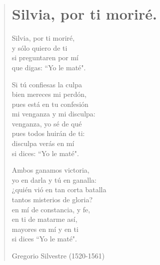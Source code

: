 \documentclass[12pt, twoside]{book}
\begin{document}
\newpage
\begin{verse}
\begin{center}
\section{Silvia, por ti moriré.}
\end{center}
Silvia, por ti moriré,\\
y sólo quiero de ti\\
si preguntaren por mí\\
que digas: ``Yo le maté".\newline

Si tú confiesas la culpa\\
bien mereces mi perdón,\\
pues está en tu confesión\\
mi venganza y mi disculpa:\\
venganza, yo sé de qué\\
pues todos huirán de ti:\\
disculpa verás en mí\\
si dices: ``Yo le maté".\newline

Ambos ganamos victoria,\\
yo en darla y tú en ganalla:\\
¿quién vió en tan corta batalla\\
tantos misterios de gloria?\\
en mí de constancia, y fe,\\
en ti de matarme así,\\
mayores en mí y en ti\\
si dices ``Yo le maté".\newline

Gregorio Silvestre (1520-1561)

\end{verse}
\end{document}
